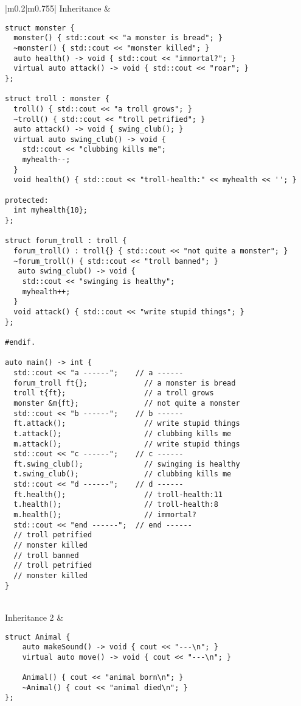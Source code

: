 \documentclass[main.tex,fontsize=8pt,paper=a4,paper=portrait,DIV=calc,]{scrartcl}
\begin{document}
\pagebreak
\begin{table}[ht!]
\begin{tabular}{|m{0.2\linewidth}|m{0.755\linewidth}|}
\hline
Inheritance & 
\begin{lstlisting}
struct monster {
  monster() { std::cout << "a monster is bread"; }
  ~monster() { std::cout << "monster killed"; }
  auto health() -> void { std::cout << "immortal?"; }
  virtual auto attack() -> void { std::cout << "roar"; }
};

struct troll : monster {
  troll() { std::cout << "a troll grows"; }
  ~troll() { std::cout << "troll petrified"; }
  auto attack() -> void { swing_club(); }
  virtual auto swing_club() -> void {
    std::cout << "clubbing kills me";
    myhealth--;
  }
  void health() { std::cout << "troll-health:" << myhealth << ''; }

protected:
  int myhealth{10};
};

struct forum_troll : troll {
  forum_troll() : troll{} { std::cout << "not quite a monster"; }
  ~forum_troll() { std::cout << "troll banned"; }
   auto swing_club() -> void {
    std::cout << "swinging is healthy";
    myhealth++;
  }
  void attack() { std::cout << "write stupid things"; }
};

#endif.

auto main() -> int {
  std::cout << "a ------";    // a ------
  forum_troll ft{};             // a monster is bread
  troll t{ft};                  // a troll grows
  monster &m{ft};               // not quite a monster
  std::cout << "b ------";    // b ------
  ft.attack();                  // write stupid things
  t.attack();                   // clubbing kills me
  m.attack();                   // write stupid things
  std::cout << "c ------";    // c ------
  ft.swing_club();              // swinging is healthy
  t.swing_club();               // clubbing kills me
  std::cout << "d ------";    // d ------
  ft.health();                  // troll-health:11
  t.health();                   // troll-health:8
  m.health();                   // immortal?
  std::cout << "end ------";  // end ------
  // troll petrified
  // monster killed
  // troll banned
  // troll petrified
  // monster killed
}
\end{lstlisting}
\\
\hline
Inheritance 2 & 
\begin{lstlisting}
struct Animal {
    auto makeSound() -> void { cout << "---\n"; }
    virtual auto move() -> void { cout << "---\n"; }

    Animal() { cout << "animal born\n"; }
    ~Animal() { cout << "animal died\n"; }
};


\end{lstlisting}
\end{tabular}
\end{table}
\end{document}

